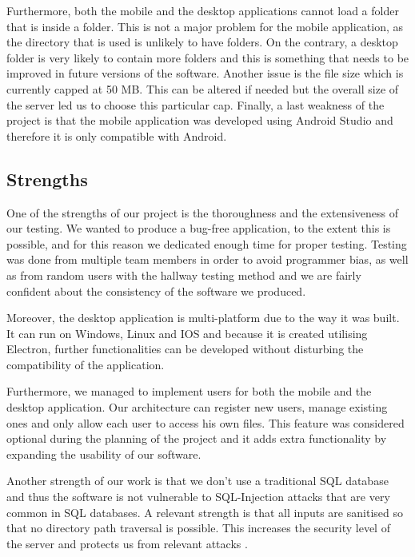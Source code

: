 \documentclass[11pt]{article}
\begin{document}
Furthermore, both the mobile and the desktop applications cannot load a folder that is inside a folder. This is not a major problem for the mobile application, as the directory that is used is unlikely to have folders. On the contrary, a desktop folder is very likely to contain more folders and this is something that needs to be improved in future versions of the software. Another issue is the file size which is currently capped at 50 MB. This can be altered if needed but the overall size of the server led us to choose this particular cap. Finally, a last weakness of the project is that the mobile application was developed using Android Studio and therefore it is only compatible with Android.

\subsection{Strengths}

One of the strengths of our project is the thoroughness and the extensiveness of our testing. We wanted to produce a bug-free application, to the extent this is possible, and for this reason we dedicated enough time for proper testing. Testing was done from multiple team members in order to avoid programmer bias, as well as from random users with the hallway testing method and we are fairly confident about the consistency of the software we produced.

Moreover, the desktop application is multi-platform due to the way it was built. It can run on Windows, Linux and IOS and because it is created utilising Electron, further functionalities can be developed without disturbing the compatibility of the application.

Furthermore, we managed to implement users for both the mobile and the desktop application. Our architecture can register new users, manage existing ones and only allow each user to access his own files. This feature was considered optional during the planning of the project and it adds extra functionality by expanding the usability of our software.

Another strength of our work is that we don't use a traditional SQL database and thus the software is not vulnerable to SQL-Injection attacks \cite{halfond:06} that are very common in SQL databases. A relevant strength is that all inputs are sanitised so that no directory path traversal is possible. This increases the security level of the server and protects us from relevant attacks \cite{danforth:09}.
\end{document}

